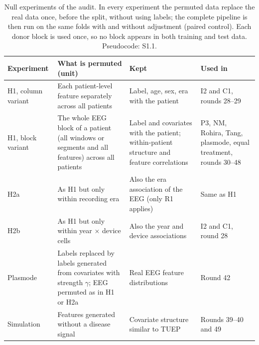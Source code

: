 \begin{table}[t]
\caption{Null experiments of the audit. In every experiment the permuted data replace the real data once, before the split, without using labels; the complete pipeline is then run on the same folds with and without adjustment (paired control). Each donor block is used once, so no block appears in both training and test data. Pseudocode: S1.1.}\label{tab:definisi_null}
\centering\scriptsize
\setlength{\tabcolsep}{2.5pt}
\begin{tabular}{p{}p{}p{}p{}}
\toprule
Experiment & What is permuted (unit) & Kept & Used in \\
\midrule
H1, column variant & Each patient-level feature separately across all patients & Label, age, sex, era with the patient & I2 and C1, rounds 28--29 \\
H1, block variant & The whole EEG block of a patient (all windows or segments and all features) across all patients & Label and covariates with the patient; within-patient structure and feature correlations & P3, NM, Rohira, Tang, plasmode, equal treatment, rounds 30--48 \\
H2a & As H1 but only within recording era & Also the era association of the EEG (only R1 applies) & Same as H1 \\
H2b & As H1 but only within year $\times$ device cells & Also the year and device associations & I2 and C1, round 28 \\
Plasmode & Labels replaced by labels generated from covariates with strength $\gamma$; EEG permuted as in H1 or H2a & Real EEG feature distributions & Round 42 \\
Simulation & Features generated without a disease signal & Covariate structure similar to TUEP & Rounds 39--40 and 49 \\
\bottomrule
\end{tabular}
\end{table}
